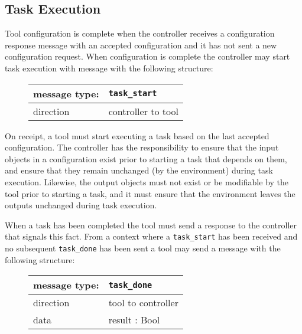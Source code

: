 \documentclass{article}
\newcommand{\msg}[1]{\texttt{#1}}
\begin{document}
  \subsection{Task Execution} \label{ss::task_execution}

   \noindent Tool configuration is complete when the controller receives a
   configuration response message with an accepted configuration and it has not
   sent a new configuration request.  When configuration is complete the
   controller may start task execution with message with the following
   structure: 

   \begin{figure}[H]
    \begin{center}
     \begin{tabular}{|ll|}
      \hline
       message type:   & \msg{task\_start} \\
      \hline
       direction       & controller to tool \\
      \hline
     \end{tabular}
    \end{center}
   \end{figure}

   \noindent On receipt, a tool must start executing a task based on the last
   accepted configuration. The controller has the responsibility to ensure that
   the input objects in a configuration exist prior to starting a task that
   depends on them, and ensure that they remain unchanged (by the environment)
   during task execution. Likewise, the output objects must not exist or be
   modifiable by the tool prior to starting a task, and it must ensure that the
   environment leaves the outputs unchanged during task execution.

   When a task has been completed the tool must send a response to the
   controller that signals this fact. From a context where a \msg{task\_start}
   has been received and no subsequent \msg{task\_done} has been sent a tool
   may send a message with the following structure:

   \begin{figure}[H]
    \begin{center}
     \begin{tabular}{|ll|}
      \hline
       message type:   & \msg{task\_done} \\
      \hline
       direction       & tool to controller \\
       data            & result : Bool \\
      \hline
     \end{tabular}
    \end{center}
   \end{figure}
\end{document}
